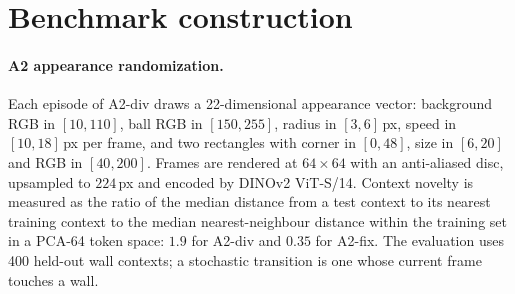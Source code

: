 \begin{table}[h]
\caption{Recorded predictions for the memorization index at 8k steps and the observed two-seed means. The two misses are marked.}
\label{tab:predfull}
\begin{center}
\small
{}
\end{center}
\end{table}

\section{Benchmark construction}
\label{app:bench}

\paragraph{A2 appearance randomization.}
Each episode of A2-div draws a 22-dimensional appearance vector: background RGB in $[10, 110]$, ball RGB in $[150, 255]$, radius in $[3, 6]$\,px, speed in $[10, 18]$\,px per frame, and two rectangles with corner in $[0, 48]$, size in $[6, 20]$ and RGB in $[40, 200]$. Frames are rendered at $64\times64$ with an anti-aliased disc, upsampled to $224$\,px and encoded by DINOv2 ViT-S/14. Context novelty is measured as the ratio of the median distance from a test context to its nearest training context to the median nearest-neighbour distance within the training set in a PCA-64 token space: $1.9$ for A2-div and $0.35$ for A2-fix. The evaluation uses 400 held-out wall contexts; a stochastic transition is one whose current frame touches a wall.

